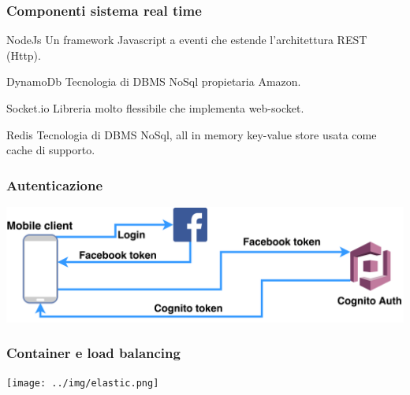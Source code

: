 \documentclass{beamer}
\begin{document}
\begin{frame}
\frametitle{Componenti sistema real time}
\begin{block}{NodeJs}
Un framework Javascript a eventi che estende l'architettura REST (Http). 
\end{block}

\begin{block}{DynamoDb}
Tecnologia di DBMS NoSql propietaria Amazon.
\end{block}

\begin{block}{Socket.io}
Libreria molto flessibile che implementa web-socket.
\end{block}

\begin{block}{Redis}
Tecnologia di DBMS NoSql, all in memory key-value store usata come cache di supporto.
\end{block}
\end{frame}




\begin{frame}
\frametitle{Autenticazione}
\centerline{\includegraphics[scale=0.07]{../img/mobile_auth.png}}
\end{frame}


\begin{frame}
\frametitle{Container e load balancing}
\centerline{\texttt{[image: ../img/elastic.png]}}
\end{frame}
\end{document}
